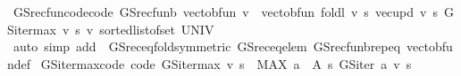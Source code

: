\begin{isabellebody}
%
\endisatagproof
{\isafoldproof}%
%
\isadelimproof
\isanewline
%
\endisadelimproof
\isanewline
{}\isamarkupfalse%
\ GS{\isacharunderscore}{\kern0pt}rec{\isacharunderscore}{\kern0pt}fun{\isacharunderscore}{\kern0pt}code{\isacharprime}{\kern0pt}{\isacharprime}{\kern0pt}{\isacharprime}{\kern0pt}{\isacharprime}{\kern0pt}{\isacharbrackleft}{\kern0pt}code{\isacharbrackright}{\kern0pt}{\isacharcolon}{\kern0pt}\ {\isachardoublequoteopen}GS{\isacharunderscore}{\kern0pt}rec{\isacharunderscore}{\kern0pt}fun\isactrlsub b\ {\isacharparenleft}{\kern0pt}vec{\isacharunderscore}{\kern0pt}to{\isacharunderscore}{\kern0pt}bfun\ v{\isacharparenright}{\kern0pt}\ {\isacharequal}{\kern0pt}\ vec{\isacharunderscore}{\kern0pt}to{\isacharunderscore}{\kern0pt}bfun\ {\isacharparenleft}{\kern0pt}foldl\ {\isacharparenleft}{\kern0pt}{\isasymlambda}v\ s{\isachardot}{\kern0pt}\ {\isacharparenleft}{\kern0pt}vec{\isacharunderscore}{\kern0pt}upd\ v\ s\ {\isacharparenleft}{\kern0pt}GS{\isacharunderscore}{\kern0pt}iter{\isacharunderscore}{\kern0pt}max\ v\ s{\isacharparenright}{\kern0pt}{\isacharparenright}{\kern0pt}{\isacharparenright}{\kern0pt}\ v\ {\isacharparenleft}{\kern0pt}sorted{\isacharunderscore}{\kern0pt}list{\isacharunderscore}{\kern0pt}of{\isacharunderscore}{\kern0pt}set\ UNIV{\isacharparenright}{\kern0pt}{\isacharparenright}{\kern0pt}{\isachardoublequoteclose}\isanewline
%
\isadelimproof
\ \ %
\endisadelimproof
%
\isatagproof
{}\isamarkupfalse%
\ {\isacharparenleft}{\kern0pt}auto\ simp\ add{\isacharcolon}{\kern0pt}\ \ GS{\isacharunderscore}{\kern0pt}rec{\isacharunderscore}{\kern0pt}eq{\isacharunderscore}{\kern0pt}fold{\isacharbrackleft}{\kern0pt}symmetric{\isacharbrackright}{\kern0pt}\ GS{\isacharunderscore}{\kern0pt}rec{\isacharunderscore}{\kern0pt}eq{\isacharunderscore}{\kern0pt}elem\ GS{\isacharunderscore}{\kern0pt}rec{\isacharunderscore}{\kern0pt}fun\isactrlsub b{\isachardot}{\kern0pt}rep{\isacharunderscore}{\kern0pt}eq\ vec{\isacharunderscore}{\kern0pt}to{\isacharunderscore}{\kern0pt}bfun{\isacharunderscore}{\kern0pt}def{\isacharparenright}{\kern0pt}%
\endisatagproof
{\isafoldproof}%
%
\isadelimproof
\isanewline
%
\endisadelimproof
\isanewline
{}\isamarkupfalse%
\ GS{\isacharunderscore}{\kern0pt}iter{\isacharunderscore}{\kern0pt}max{\isacharunderscore}{\kern0pt}code\ {\isacharbrackleft}{\kern0pt}code{\isacharbrackright}{\kern0pt}{\isacharcolon}{\kern0pt}\ {\isachardoublequoteopen}GS{\isacharunderscore}{\kern0pt}iter{\isacharunderscore}{\kern0pt}max\ v\ s\ {\isacharequal}{\kern0pt}\ {\isacharparenleft}{\kern0pt}MAX\ a\ {\isasymin}\ A\ s{\isachardot}{\kern0pt}\ GS{\isacharunderscore}{\kern0pt}iter\ a\ v\ s{\isacharparenright}{\kern0pt}{\isachardoublequoteclose}\isanewline

\end{isabellebody}

